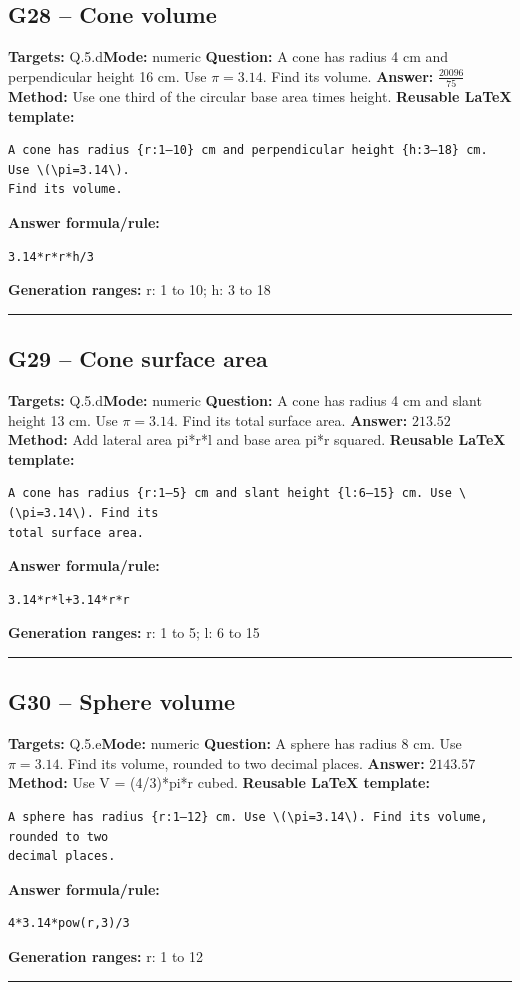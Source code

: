 \documentclass[11pt]{article}
\begin{document}
\subsection{G28 -- Cone volume}
\textbf{Targets:} Q.5.d\quad\textbf{Mode:} numeric
\textbf{Question:} A cone has radius 4 cm and perpendicular height 16 cm. Use \(\pi=3.14\). Find its volume.
\textbf{Answer:} \(\frac{20096}{75}\)
\textbf{Method:} Use one third of the circular base area times height.
\textbf{Reusable LaTeX template:}
\begin{verbatim}
A cone has radius {r:1–10} cm and perpendicular height {h:3–18} cm. Use \(\pi=3.14\).
Find its volume.
\end{verbatim}
\textbf{Answer formula/rule:}
\begin{verbatim}
3.14*r*r*h/3
\end{verbatim}
\textbf{Generation ranges:} r: 1 to 10; h: 3 to 18
\medskip\hrule\medskip
\subsection{G29 -- Cone surface area}
\textbf{Targets:} Q.5.d\quad\textbf{Mode:} numeric
\textbf{Question:} A cone has radius 4 cm and slant height 13 cm. Use \(\pi=3.14\). Find its total surface area.
\textbf{Answer:} \(213.52\)
\textbf{Method:} Add lateral area pi*r*l and base area pi*r squared.
\textbf{Reusable LaTeX template:}
\begin{verbatim}
A cone has radius {r:1–5} cm and slant height {l:6–15} cm. Use \(\pi=3.14\). Find its
total surface area.
\end{verbatim}
\textbf{Answer formula/rule:}
\begin{verbatim}
3.14*r*l+3.14*r*r
\end{verbatim}
\textbf{Generation ranges:} r: 1 to 5; l: 6 to 15
\medskip\hrule\medskip
\subsection{G30 -- Sphere volume}
\textbf{Targets:} Q.5.e\quad\textbf{Mode:} numeric
\textbf{Question:} A sphere has radius 8 cm. Use \(\pi=3.14\). Find its volume, rounded to two decimal places.
\textbf{Answer:} \(2143.57\)
\textbf{Method:} Use V = (4/3)*pi*r cubed.
\textbf{Reusable LaTeX template:}
\begin{verbatim}
A sphere has radius {r:1–12} cm. Use \(\pi=3.14\). Find its volume, rounded to two
decimal places.
\end{verbatim}
\textbf{Answer formula/rule:}
\begin{verbatim}
4*3.14*pow(r,3)/3
\end{verbatim}
\textbf{Generation ranges:} r: 1 to 12
\medskip\hrule\medskip
\end{document}
